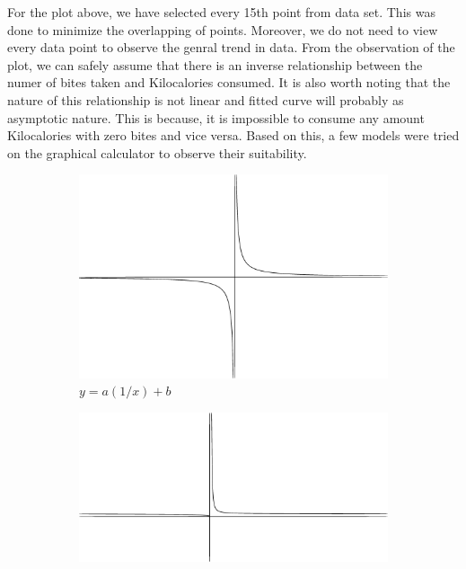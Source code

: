 \documentclass{article}
\begin{document}
\vspace{10mm}
For the plot above, we have selected every 15th point from data set. This was done to minimize the overlapping of points. Moreover, we do not need to view every data point to observe the genral trend in data. From the observation of the plot, we can safely assume that there is an inverse relationship between the numer of bites taken and Kilocalories consumed. It is also worth noting that the nature of this relationship is not linear and fitted curve will probably as asymptotic nature. This is because, it is impossible to consume any amount Kilocalories with zero bites and vice versa. Based on this, a few models were tried on the graphical calculator to observe their suitability.

\begin{figure}[!htb]
     \centering
     \begin{subfigure}[b]{0.4\textwidth}
         \centering
         \includegraphics[width=\textwidth]{First_model.eps}
         \caption{$y=a(1/x)+ b $}
         \label{plt:14}
     \end{subfigure}
     \hfill
     \begin{subfigure}[b]{0.5\textwidth}
         \centering
         \includegraphics[width=\textwidth]{Second_model.eps}

\end{subfigure}
\end{figure}
\end{document}

